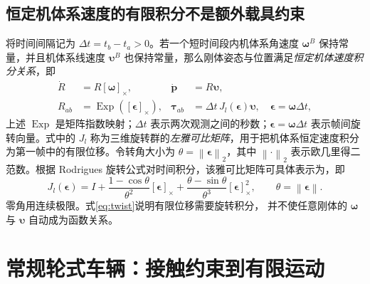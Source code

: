 \documentclass[UTF8,a4paper,fontset=fandol,11pt]{ctexart}
\newcommand{\sk}[1]{[#1]_{\times}}
\newcommand{\norm}[1]{\left\lVert#1\right\rVert}
\newcommand{\vct}[1]{\bm #1}
\begin{document}
\subsection{恒定机体系速度的有限积分不是额外载具约束}
将时间间隔记为 $\Delta t=t_b-t_a>0$。若一个短时间段内机体系角速度 $\vct\omega^B$ 保持常量，并且机体系线速度 $\vct\upsilon^B$ 也保持常量，那么刚体姿态与位置满足\emph{恒定机体速度积分关系}，即
\begin{align}
 \dot R&=R\sk{\vct\omega},& \dot{\vct p}&=R\vct\upsilon,\\
 R_{ab}&=\operatorname{Exp}(\sk{\vct\epsilon}),&
 \vct\tau_{ab}&=\Delta t\,J_l(\vct\epsilon)\vct\upsilon,
 \quad\vct\epsilon=\vct\omega\Delta t,\label{eq:twist}
\end{align}
上述 $\operatorname{Exp}$ 是矩阵指数映射；$\Delta t$ 表示两次观测之间的秒数；$\vct\epsilon=\vct\omega\Delta t$ 表示帧间旋转向量。式中的 $J_l$ 称为三维旋转群的\emph{左雅可比矩阵}，用于把机体系恒定速度积分为第一帧中的有限位移。令转角大小为 $\theta=\norm{\vct\epsilon}_2$，其中 $\norm{\cdot}_2$ 表示欧几里得二范数。根据 Rodrigues 旋转公式对时间积分，该雅可比矩阵可具体表示为，即
\begin{equation}
 J_l(\vct\epsilon)=I+
 \frac{1-\cos\theta}{\theta^2}\sk{\vct\epsilon}
 +\frac{\theta-\sin\theta}{\theta^3}\sk{\vct\epsilon}^2,
 \qquad\theta=\norm{\vct\epsilon}.
\end{equation}
零角用连续极限。式\eqref{eq:twist}说明有限位移需要旋转积分，
并不使任意刚体的 $\vct\omega$ 与 $\vct\upsilon$ 自动成为函数关系。

\section{常规轮式车辆：接触约束到有限运动}
\end{document}
